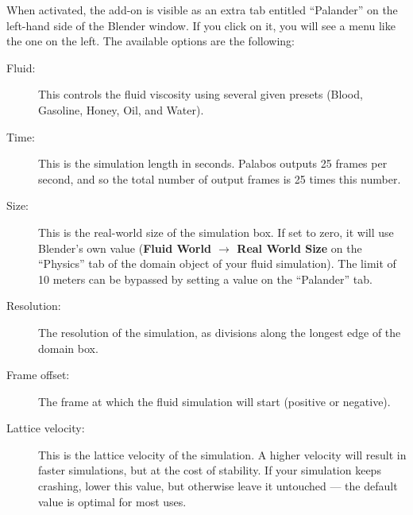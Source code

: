 \documentclass[12pt]{article}
\begin{document}
\begin{minipage}{0.75\textwidth}
When activated, the add-on is visible as an extra tab entitled ``Palander'' on the left-hand side of the 
Blender window. If you click on it, you will see a menu like the one on the left. The available options are 
the following:
\begin{description}
\item[Fluid:] This controls the fluid viscosity using several given presets (Blood, Gasoline, Honey, Oil, and 
Water).
\item[Time:] This is the simulation length in seconds. Palabos outputs 25 frames per second, and so the total 
number of output frames is 25 times this number.
\item[Size:] This is the real-world size of the simulation box. If set to zero, it will use Blender's own 
value ({\bf Fluid World $\to$ Real World Size} on the ``Physics'' tab of the domain object of your fluid 
simulation). The limit of 10 meters can be bypassed by setting a value on the ``Palander'' tab.
\item[Resolution:] The resolution of the simulation, as divisions along the longest edge of the domain box.
\item[Frame offset:] The frame at which the fluid simulation will start (positive or negative).
\item[Lattice velocity:] This is the lattice velocity of the simulation. A higher velocity will result in 
faster simulations, but at the cost of stability. If your simulation keeps crashing, lower this value, but 
otherwise leave it untouched --- the default value is optimal for most uses.
\end{description}
\end{minipage}
\end{document}
